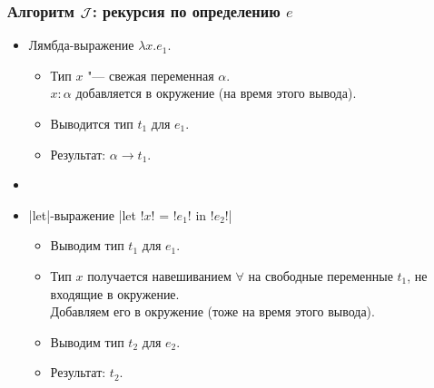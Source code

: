 \documentclass[11pt]{beamer}
\begin{document}
\begin{frame}[fragile]
  \frametitle{Алгоритм $\mathcal{J}$: рекурсия по определению $e$}
  \begin{itemize}
    \item Лямбда-выражение $\lambda x.e_1$.
          \pause
          \begin{itemize}
            \item Тип $x$ "--- свежая переменная $\alpha$. \\ $x : \alpha$ добавляется в окружение (на время этого вывода).
            \item Выводится тип $t_1$ для $e_1$.
            \item Результат: \pause $\alpha \to t_1$.
          \end{itemize}
          \pause
    \item[]
    \item \haskinline|let|-выражение \haskinline|let !$x$! = !$e_1$! in !$e_2$!|
          \pause
          \begin{itemize}
            \item Выводим тип $t_1$ для $e_1$.
            \item Тип $x$ получается навешиванием $\forall$ на свободные переменные $t_1$, не входящие в окружение.
                  \\ Добавляем его в окружение \pause (тоже на время этого вывода).
            \item Выводим тип $t_2$ для $e_2$.
            \item Результат: \pause $t_2$.
          \end{itemize}
  \end{itemize}
\end{frame}

\end{document}
